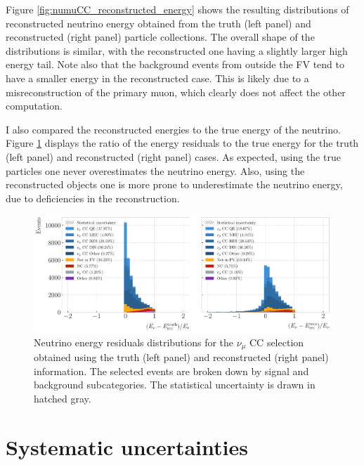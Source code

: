 Figure \ref{fig:numuCC_reconstructed_energy} shows the resulting distributions of reconstructed neutrino energy obtained from the truth (left panel) and reconstructed (right panel) particle collections. The overall shape of the distributions is similar, with the reconstructed one having a slightly larger high energy tail. Note also that the background events from outside the FV tend to have a smaller energy in the reconstructed case. This is likely due to a misreconstruction of the primary muon, which clearly does not affect the other computation.

I also compared the reconstructed energies to the true energy of the neutrino. Figure \ref{fig:numuCC_reconstructed_fresiduals} displays the ratio of the energy residuals to the true energy for the truth (left panel) and reconstructed (right panel) cases. As expected, using the true particles one never overestimates the neutrino energy. Also, using the reconstructed objects one is more prone to underestimate the neutrino energy, due to deficiencies in the reconstruction.

\begin{figure}[t]
    \centering
    \includegraphics[width=.99\linewidth]{Images/GAr_selection/numuCC_selection_truth_reco_energy_fresiduals_comparison.pdf}
    \caption[Neutrino energy residuals distributions for the $\nu_{\mu}$ CC selection obtained using the truth and reconstructed information]{Neutrino energy residuals distributions for the $\nu_{\mu}$ CC selection obtained using the truth (left panel) and reconstructed (right panel) information. The selected events are broken down by signal and background subcategories. The statistical uncertainty is drawn in hatched gray.}
    \label{fig:numuCC_reconstructed_fresiduals}
\end{figure}

\section{Systematic uncertainties}

